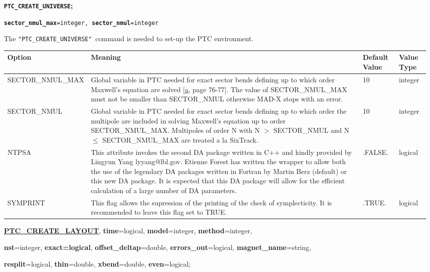 \begin{description}
	\item[Commands] 
	\item \texttt{\textbf{\textbf{PTC\_CREATE\_UNIVERSE}}}\textbf{\textbf{;}}
	 
\texttt{\textbf{sector\_nmul\_max}=integer, \textbf{sector\_nmul}=integer}
	\item[Description] 
The \texttt{"PTC\_CREATE\_UNIVERSE" }command is needed to set-up  the PTC environment.

	\item[Options] 
	\text{ \\}	%
	
\begin{tabular}{l p{6cm} p{1.5cm} p{1.5cm}}
\hline 
\textbf{Option} & \textbf{Meaning} & \textbf{Default Value} & \textbf{Value Type} \\ 
\hline
SECTOR\_NMUL\_MAX & Global variable in PTC needed for       exact sector bends defining up to which order Maxwell's       equation are solved [\hyperlink{E.Forest}{a}, page       76-77]. The value of SECTOR\_NMUL\_MAX must not be       smaller than SECTOR\_NMUL otherwise MAD-X stops with an       error. & 10 & integer \\ 
\hline
SECTOR\_NMUL & Global variable in PTC needed for exact sector bends defining up to which order the multipole are included in solving Maxwell's equation up to order SECTOR\_NMUL\_MAX. Multipoles of order N with N $>$ SECTOR\_NMUL and N $\leq$ SECTOR\_NMUL\_MAX are treated a la SixTrack. & 10 & integer \\ 
\hline
NTPSA & This attribute invokes the second DA package written in C++ and kindly provided by Lingyun Yang  lyyang@lbl.gov. Etienne Forest has written the wrapper to allow  both the use of the legendary DA packages written in Fortran by  Martin Berz (default) or this new DA package. It is expected that this DA package will allow for the efficient calculation of a large number of DA parameters. & .FALSE. & logical \\ 
\hline
SYMPRINT & This flag allows the supression of the printing of the check of symplecticity. It is recommended to leave this flag set to TRUE. & .TRUE. & logical \\ 
\hline
\end{tabular}

  \item \textbf{\href{PTC_CREATE_LAYOUT}{PTC\_CREATE\_LAYOUT}}, \textbf{ time}=logical,\textbf{ model}=integer,       \textbf{method}=integer,
  
\textbf{ nst}=integer, \textbf{exact=logical},       \textbf{offset\_deltap}=double, \textbf{errors\_out}=logical,       \textbf{magnet\_name}=string, 

\textbf{resplit}=logical, \textbf{thin}=double,       \textbf{xbend}=double, \textbf{even}=logical;
	
\end{description}
